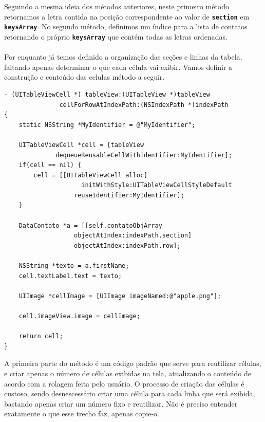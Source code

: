 \documentclass[a4paper,12pt,brazil,doubleside]{book}
\begin{document}
Seguindo a mesma ideia dos métodos anteriores, neste primeiro método retornamos a letra contida na posição correspondente ao valor de \texttt{\textbf{section}} em \texttt{\textbf{keysArray}}. No segundo método, definimos um índice para a lista de contatos retornando o próprio \texttt{\textbf{keysArray}} que contém todas as letras ordenadas.
\paragraph{}Por enquanto já temos definido a organização das seções e linhas da tabela, faltando apenas determinar o que cada célula vai exibir. Vamos definir a construção e conteúdo das celulas método a seguir.

\pagebreak

\begin{listing}
\begin{verbatim}
- (UITableViewCell *) tableView:(UITableView *)tableView
               cellForRowAtIndexPath:(NSIndexPath *)indexPath
{
    static NSString *MyIdentifier = @"MyIdentifier";
    
    UITableViewCell *cell = [tableView 
              dequeueReusableCellWithIdentifier:MyIdentifier];
    if(cell == nil) {
        cell = [[UITableViewCell alloc] 
                     initWithStyle:UITableViewCellStyleDefault
                   reuseIdentifier:MyIdentifier];
    }

    DataContato *a = [[self.contatoObjArray
                   objectAtIndex:indexPath.section]
                   objectAtIndex:indexPath.row];

    NSString *texto = a.firstName;
    cell.textLabel.text = texto;
        
    UIImage *cellImage = [UIImage imageNamed:@"apple.png"];
        
    cell.imageView.image = cellImage;
    
    return cell;
}
\end{verbatim}
\end{listing}

A primeira parte do método é um código padrão que serve para reutilizar células, e criar apenas o número de células exibidas na tela, atualizando o conteúdo de acordo com a rolagem feita pelo usuário. O processo de criação das células é custoso, sendo desnescessário criar uma célula para cada linha que será exibida, bastando apenas criar um número fixo e reutilizar. Não é preciso entender exatamente o que esse trecho faz, apenas copie-o.
\end{document}
